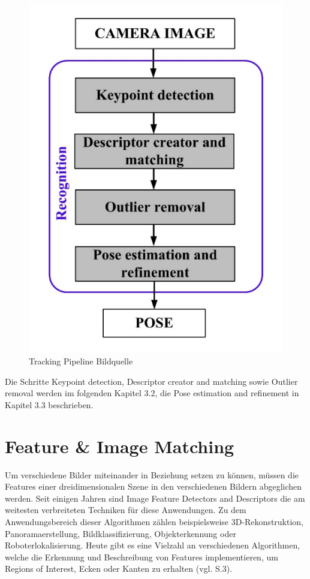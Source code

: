 \begin{figure}[H]
	\centering
	\includegraphics[scale=0.55]{tracking_pipeline.png}
	\caption{Tracking Pipeline Bildquelle \cite{natural_feature}}
\end{figure} 

Die Schritte \glqq Keypoint detection\grqq{}, \glqq  Descriptor creator and matching\grqq{} sowie \glqq Outlier removal\grqq{} werden im folgenden Kapitel 3.2, die \glqq Pose estimation and refinement\grqq{} in Kapitel 3.3 beschrieben.


\section{Feature \& Image Matching}

Um verschiedene Bilder miteinander in Beziehung setzen zu können, müssen die Features einer dreidimensionalen Szene in den verschiedenen Bildern abgeglichen werden. Seit einigen Jahren sind \glqq Image Feature Detectors and Descriptors\grqq{} die am weitesten verbreiteten Techniken für diese Anwendungen. Zu dem Anwendungsbereich dieser Algorithmen zählen beispielsweise 3D-Rekonstruktion, Panoramaerstellung, Bildklassifizierung, Objekterkennung oder Roboterlokalisierung. Heute gibt es eine Vielzahl an verschiedenen Algorithmen, welche die Erkennung und Beschreibung von Features implementieren, um \glqq Regions of Interest\grqq{}, Ecken oder Kanten zu erhalten (vgl. \cite{robust_feature} S.3).\\

